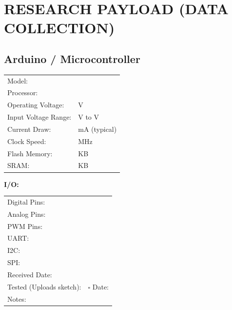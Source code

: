 \documentclass[10pt,letterpaper]{article}
\begin{document}
\newpage

\section*{RESEARCH PAYLOAD (DATA COLLECTION)}

\subsection*{Arduino / Microcontroller}
\begin{tabularx}{\textwidth}{lX}
Model: & \underline{\hspace{8cm}} \\
Processor: & \underline{\hspace{6cm}} \\
Operating Voltage: & \underline{\hspace{4cm}} V \\
Input Voltage Range: & \underline{\hspace{2cm}} V to \underline{\hspace{2cm}} V \\
Current Draw: & \underline{\hspace{3cm}} mA (typical) \\
Clock Speed: & \underline{\hspace{4cm}} MHz \\
Flash Memory: & \underline{\hspace{4cm}} KB \\
SRAM: & \underline{\hspace{4cm}} KB \\
\end{tabularx}

\textbf{I/O:}
\begin{tabularx}{\textwidth}{lX}
Digital Pins: & \underline{\hspace{3cm}} \\
Analog Pins: & \underline{\hspace{3cm}} \\
PWM Pins: & \underline{\hspace{3cm}} \\
UART: & \underline{\hspace{3cm}} \\
I2C: & \underline{\hspace{3cm}} \\
SPI: & \underline{\hspace{3cm}} \\[0.5em]
Received Date: & \underline{\hspace{4cm}} \\
Tested (Uploads sketch): & $\square$ \quad Date: \underline{\hspace{3cm}} \\
Notes: & \underline{\hspace{10cm}} \\
\end{tabularx}
\end{document}
